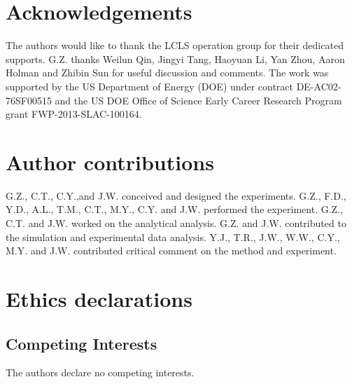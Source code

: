 \documentclass[%
 preprint,
 amsmath,amssymb,
 aps,
 prl,
 superscriptaddress,
 floatfix,
 letter,
]{revtex4-1}
\begin{document}
\section{Acknowledgements}
\begin{acknowledgments}
The authors would like to thank the LCLS operation group for their dedicated supports. G.Z. thanks Weilun Qin, Jingyi Tang, Haoyuan Li, Yan Zhou, Aaron Holman and Zhibin Sun for useful discussion and comments. The work was supported by the US Department of Energy (DOE) under contract DE-AC02-76SF00515 and the US DOE Office of Science Early Career Research Program grant FWP-2013-SLAC-100164.
\end{acknowledgments}

\section{Author contributions}
G.Z., C.T., C.Y.,and J.W. conceived and designed the experiments. G.Z., F.D., Y.D., A.L., T.M., C.T., M.Y., C.Y. and J.W. performed the experiment. G.Z., C.T. and J.W. worked on the analytical analysis. G.Z. and J.W. contributed to the simulation and experimental data analysis. Y.J., T.R., J.W., W.W., C.Y., M.Y. and J.W. contributed critical comment on the method and experiment.
\section{Ethics declarations}
\subsection{Competing Interests}
The authors declare no competing interests.
\end{document}
